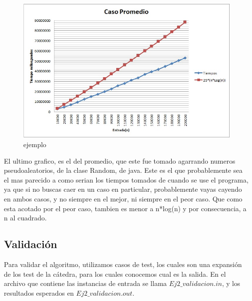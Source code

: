 \begin{figure}[H]
  \begin{center}
      \includegraphics[scale=0.50]{imagenes/CasoPromedioEj2.jpg}
  \end{center}
  \caption{ejemplo}
\end{figure}

El ultimo grafico, es el del promedio, que este fue tomado agarrando numeros pseudoaleatorios, de la clase Random, de java. Este es el que probablemente
sea el mas parecido a como serian los tiempos tomados de cuando se use el programa, ya que si no buscas caer en un caso en particular, probablemente vayas cayendo en ambos casos, y 
no siempre en el mejor, ni siempre en el peor caso. Que como esta acotado por el peor caso, tambien es menor a n*log(n) y por consecuencia, a n al cuadrado.

\subsection{Validación}

Para validar el algoritmo, utilizamos casos de test, los cuales son una expansión de los test de la cátedra, para los cuales conocemos cual es la salida. En el archivo que contiene las instancias de entrada se llama $ Ej2\_validacion.in $, y los resultados esperados en $ Ej2\_validacion.out $.
